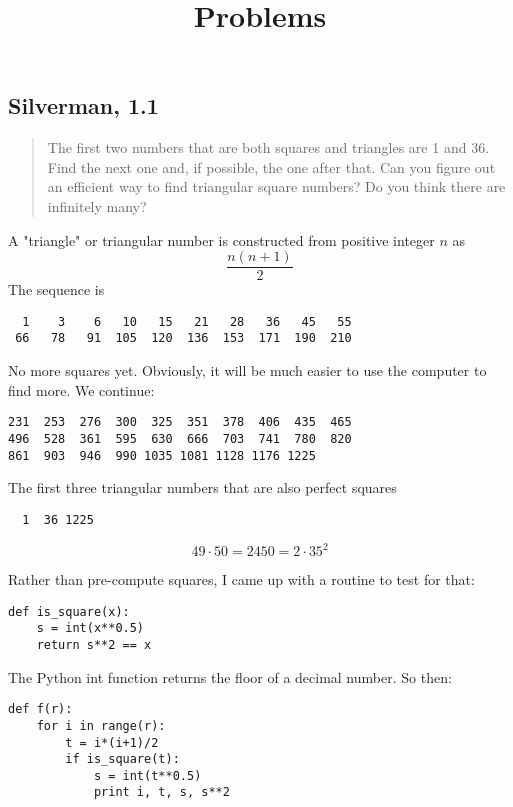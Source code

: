 \documentclass[11pt, oneside]{article}
\title{Problems}
\date{}
\begin{document}
\maketitle
\Large


\subsection*{Silverman, 1.1}

\begin{quote}The first two numbers that are both squares and triangles are 1 and 36.  Find the next one and, if possible, the one after that.  Can you figure out an efficient way to find triangular square numbers?  Do you think there are infinitely many?\end{quote}

A "triangle" or triangular number is constructed from positive integer $n$ as 
\[ \frac{n (n+1)}{2} \]
The sequence is

\begin{verbatim}
  1    3    6   10   15   21   28   36   45   55  
 66   78   91  105  120  136  153  171  190  210
\end{verbatim}

No more squares yet.  Obviously, it will be much easier to use the computer to find more.  We continue:

\begin{verbatim}
231  253  276  300  325  351  378  406  435  465
496  528  361  595  630  666  703  741  780  820
861  903  946  990 1035 1081 1128 1176 1225
\end{verbatim}

The first three triangular numbers that are also perfect squares
\begin{verbatim}
  1  36 1225
\end{verbatim}

\[ 49 \cdot 50 = 2450 = 2 \cdot 35^2 \]

Rather than pre-compute squares, I came up with a routine to test for that:

\begin{verbatim}
def is_square(x):
    s = int(x**0.5)
    return s**2 == x
\end{verbatim}

The Python int function returns the floor of a decimal number.  So then:

\begin{verbatim}
def f(r):
    for i in range(r):
        t = i*(i+1)/2
        if is_square(t):
            s = int(t**0.5)
            print i, t, s, s**2
\end{verbatim}
\end{document}
